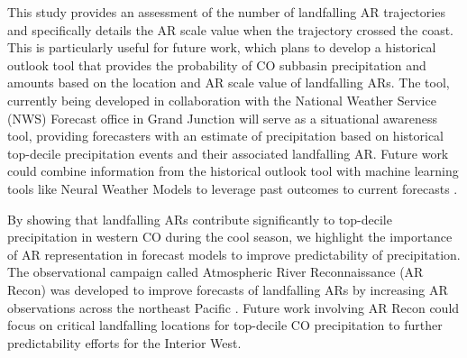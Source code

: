 \documentclass[draft]{agujournal2019}
\begin{document}
This study provides an assessment of the number of landfalling AR trajectories and specifically details the AR scale \cite{MartinRalph2019} value when the trajectory crossed the coast. This is particularly useful for future work, which plans to develop a historical outlook tool that provides the probability of CO subbasin precipitation and amounts based on the location and AR scale value of landfalling ARs. The tool, currently being developed in collaboration with the National Weather Service (NWS) Forecast office in Grand Junction will serve as a situational awareness tool, providing forecasters with an estimate of precipitation based on historical top-decile precipitation events and their associated landfalling AR. Future work could combine information from the historical outlook tool with machine learning tools like Neural Weather Models to leverage past outcomes to current forecasts \cite{Bano-Medina2025TowardForecasts}. 

By showing that landfalling ARs contribute significantly to top-decile precipitation in western CO during the cool season, we highlight the importance of AR representation in forecast models to improve predictability of precipitation. The observational campaign called Atmospheric River Reconnaissance (AR Recon) was developed to improve forecasts of landfalling ARs by increasing AR observations across the northeast Pacific \cite{Lavers2024AdvancingProgram, Ralph2020WestReconnaissance}. Future work involving AR Recon could focus on critical landfalling locations for top-decile CO precipitation to further predictability efforts for the Interior West. 






\end{document}
